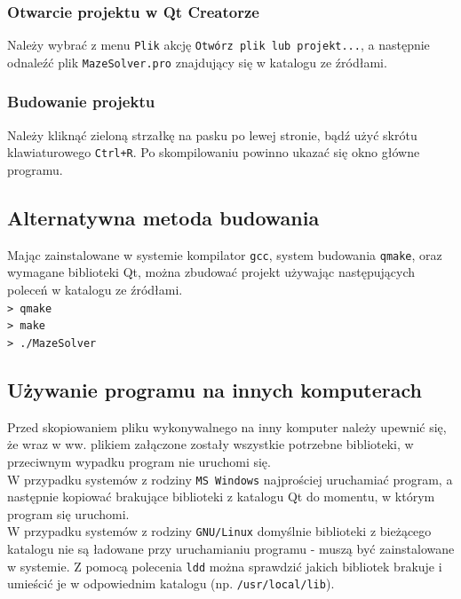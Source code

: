 \documentclass[12pt,a4paper]{article}
\begin{document}
	\subsubsection{Otwarcie projektu w Qt Creatorze}
	Należy wybrać z menu \texttt{Plik} akcję \texttt{Otwórz plik lub projekt...},
	a następnie odnaleźć plik \texttt{MazeSolver.pro} znajdujący się w katalogu ze
	źródłami.
	
	\subsubsection{Budowanie projektu}
	Należy kliknąć zieloną strzałkę na pasku po lewej stronie, bądź użyć
	skrótu klawiaturowego \texttt{Ctrl+R}. Po skompilowaniu powinno ukazać
	się okno główne programu.

	\subsection{Alternatywna metoda budowania}
	
	Mając zainstalowane w systemie kompilator \texttt{gcc}, system budowania
	\texttt{qmake}, oraz wymagane biblioteki Qt, można zbudować projekt używając
	następujących poleceń w katalogu ze źródłami.\\
	\texttt{> qmake}\\
	\texttt{> make} \\
	\texttt{> ./MazeSolver} \\
	
	\subsection{Używanie programu na innych komputerach}
	Przed skopiowaniem pliku wykonywalnego na inny komputer należy upewnić się,
	że wraz w ww. plikiem załączone zostały wszystkie potrzebne biblioteki, w
	przeciwnym wypadku program nie uruchomi się.\\
	
	W przypadku systemów z rodziny \texttt{MS Windows} najprościej uruchamiać
	program, a następnie kopiować brakujące biblioteki z katalogu Qt do momentu, w
	którym program się uruchomi.\\
	
	W przypadku systemów z rodziny \texttt{GNU/Linux} domyślnie biblioteki z 
	bieżącego katalogu nie są ładowane przy uruchamianiu programu - muszą być
	zainstalowane w systemie. Z pomocą polecenia \texttt{ldd} można sprawdzić
	jakich bibliotek brakuje i umieścić je w odpowiednim katalogu (np. \texttt{/usr/local/lib}).
\end{document}
